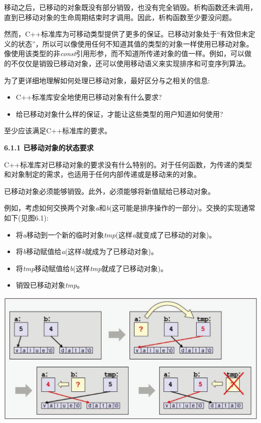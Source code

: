 移动之后，已移动的对象既没有部分销毁，也没有完全销毁。析构函数还未调用，直到已移动对象的生命周期结束时才调用。因此，析构函数至少要没问题。\par

然而，C++标准库为可移动类型提供了更多的保证。已移动对象处于“有效但未定义的状态”，所以可以像使用任何不知道其值的类型的对象一样使用已移动对象。像使用该类型的非\textit{const}引用形参，而不知道所传递对象的值一样。例如，可以做的不仅仅是销毁已移动对象，还可以使用移动语义来实现排序和可变序列算法。\par

为了更详细地理解如何处理已移动对象，最好区分与之相关的信息:\par

\begin{itemize}
	\item C++标准库安全地使用已移动对象有什么要求?
	\item 给已移动对象什么样的保证，才能让这些类型的用户知道如何使用?
\end{itemize}

至少应该满足C++标准库的要求。\par

\hspace*{\fill} \par %
\textbf{6.1.1 已移动对象的状态要求}

C++标准库对已移动对象的要求没有什么特别的。对于任何函数，为传递的类型和对象制定的需求，也适用于任何内部传递或是移动来的对象。\par

已移动对象必须能够销毁。此外，必须能够将新值赋给已移动对象。\par

例如，考虑如何交换两个对象\textit{a}和\textit{b}(这可能是排序操作的一部分)。交换的实现通常如下(见图6.1):\par

\begin{itemize}
	\item 将\textit{a}移动到一个新的临时对象\textit{tmp}(这样\textit{a}就变成了已移动的对象)。
	\item 将\textit{b}移动赋值给\textit{a}(这样\textit{b}就成为了已移动对象)。
	\item 将\textit{tmp}移动赋值给\textit{b}(这样\textit{tmp}就成了已移动对象)。
	\item 销毁已移动对象\textit{tmp}。
\end{itemize}

\begin{center}
	\includegraphics[width=1.0\textwidth]{content/1/chapter6/images/1}
\end{center}

